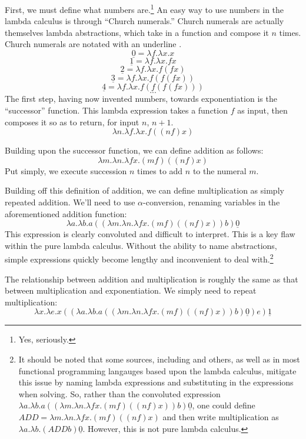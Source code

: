 \documentclass[twocolumn,titlepage,12pt]{article}
\begin{document}
First, we must define what numbers are.\footnote{Yes, seriously.} An easy way to use numbers in the lambda calculus is through ``Church numerals.'' Church numerals are actually themselves lambda abstractions, which take in a function and compose it $n$ times. Church numerals are notated with an underline \cite{cornelllc}.
$$\underline{0}=\lambda f.\lambda x.x$$
$$\underline{1}=\lambda f.\lambda x.fx$$
$$\underline{2}=\lambda f.\lambda x.f(fx)$$
$$\underline{3}=\lambda f.\lambda x.f(f(fx))$$
$$\underline{4}=\lambda f.\lambda x.f(f(f(fx)))$$
$$...$$
The first step, having now invented numbers, towards exponentiation is the ``successor'' function. This lambda expression takes a function $f$ as input, then composes it so as to return, for input $n$, $n+1$.
$$\lambda n.\lambda f.\lambda x.f((n f) x)$$

Building upon the successor function, we can define addition as follows:
$$\lambda m.\lambda n.\lambda fx.(m f) ((n f) x)$$
Put simply, we execute succession $n$ times to add $n$ to the numeral $m$.

Building off this definition of addition, we can define multiplication as simply repeated addition. We'll need to use $\alpha$-conversion, renaming variables in the aforementioned addition function:
$$\lambda a.\lambda b.a ((\lambda m.\lambda n.\lambda fx.(m f) ((n f) x)) b) \underline{0}$$
This expression is clearly convoluted and difficult to interpret. This is a key flaw within the pure lambda calculus. Without the ability to name abstractions, simple expressions quickly become lengthy and inconvenient to deal with.\footnote{It should be noted that some sources, including \cite{cornellc}\cite{rojastutorial} and others, as well as in most functional programming langauges based upon the lambda calculus, mitigate this issue by naming lambda expressions and substituting in the expressions when solving. So, rather than the convoluted expression $\lambda a.\lambda b.a ((\lambda m.\lambda n.\lambda fx.(m f) ((n f) x)) b) \underline{0}$, one could define $ADD=\lambda m.\lambda n.\lambda fx.(m f) ((n f) x)$ and then write multiplication as $\lambda a.\lambda b.(ADD b) \underline{0}$. However, this is not pure lambda calculus.}

The relationship between addition and multiplication is roughly the same as that between multiplication and exponentiation. We simply need to repeat multiplication:
$$\lambda x.\lambda e.x ((\lambda a.\lambda b.a ((\lambda m.\lambda n.\lambda fx.(m f) ((n f) x)) b) \underline{0}) e) \underline{1}$$
\end{document}
